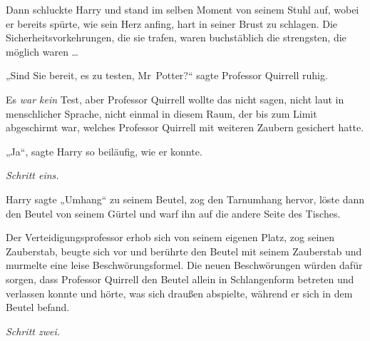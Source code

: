 Dann schluckte Harry und stand im selben Moment von seinem Stuhl auf, wobei er bereits spürte, wie sein Herz anfing, hart in seiner Brust zu schlagen. Die Sicherheitsvorkehrungen, die sie trafen, waren buchstäblich die strengsten, die möglich waren …

„Sind Sie bereit, es zu testen, Mr~Potter?“ sagte Professor Quirrell ruhig.

Es \emph{war kein} Test, aber Professor Quirrell wollte das nicht sagen, nicht laut in menschlicher Sprache, nicht einmal in diesem Raum, der bis zum Limit abgeschirmt war, welches Professor Quirrell mit weiteren Zaubern gesichert hatte.

„Ja“, sagte Harry so beiläufig, wie er konnte.

\emph{Schritt eins.}

Harry sagte
„Umhang“ zu seinem Beutel, zog den Tarnumhang hervor, löste dann den Beutel von seinem Gürtel und warf ihn auf die andere Seite des Tisches.

Der Verteidigungsprofessor erhob sich von seinem eigenen Platz, zog seinen Zauberstab, beugte sich vor und berührte den Beutel mit seinem Zauberstab und murmelte eine leise Beschwörungsformel. Die neuen Beschwörungen würden dafür sorgen, dass Professor Quirrell den Beutel allein in Schlangenform betreten und verlassen konnte und hörte, was sich draußen abspielte, während er sich in dem Beutel befand.

\emph{Schritt zwei.}

